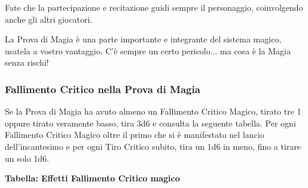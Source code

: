 \begin{multicols}{2}
\begin{changemargin}{0.3cm}{0.3cm}
\begin{narratore}
Fate che la partecipazione e recitazione guidi sempre il personaggio, coinvolgendo anche gli altri giocatori.
\end{narratore}\end{changemargin}




\begin{changemargin}{0.3cm}{0.3cm}\begin{tcolorbox}[title = Osare la Prova di Magia]
La Prova di Magia è una parte importante e integrante del sistema magico, usatela a vostro vantaggio. C'è sempre un certo pericolo... ma cosa è la Magia senza rischi!
\end{tcolorbox}\end{changemargin}


\subsubsection{Fallimento Critico nella Prova di Magia}\label{magiefallimentocriticonellaprovadimagia}\hypertarget{magiefallimentocriticonellaprovadimagia}{}

Se la Prova di Magia ha avuto almeno un Fallimento Critico Magico, tirato tre 1 oppure tirato veramente basso, tira 3d6 e consulta la seguente tabella. Per ogni Fallimento Critico Magico oltre il primo che si è manifestato nel lancio dell'incantesimo e per ogni Tiro Critico subito, tira un 1d6 in meno, fino a tirare un solo 1d6.

\medskip

\textbf{Tabella: Effetti Fallimento Critico magico}

\medskip


\end{multicols}

